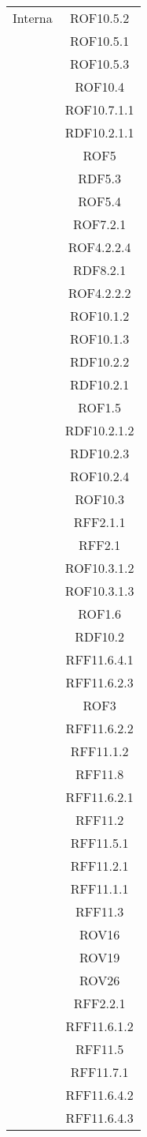 \begin{longtable}{|c|c|}
\midrule
Interna
& ROF10.5.2\\
& ROF10.5.1\\
& ROF10.5.3\\
& ROF10.4\\
& ROF10.7.1.1\\
& RDF10.2.1.1\\
& ROF5\\
& RDF5.3\\
& ROF5.4\\
& ROF7.2.1\\
& ROF4.2.2.4\\
& RDF8.2.1\\
& ROF4.2.2.2\\
& ROF10.1.2\\
& ROF10.1.3\\
& RDF10.2.2\\
& RDF10.2.1\\
& ROF1.5\\
& RDF10.2.1.2\\
& RDF10.2.3\\
& ROF10.2.4\\
& ROF10.3\\
& RFF2.1.1\\
& RFF2.1\\
& ROF10.3.1.2\\
& ROF10.3.1.3\\
& ROF1.6\\
& RDF10.2\\
& RFF11.6.4.1\\
& RFF11.6.2.3\\
& ROF3\\
& RFF11.6.2.2\\
& RFF11.1.2\\
& RFF11.8\\
& RFF11.6.2.1\\
& RFF11.2\\
& RFF11.5.1\\
& RFF11.2.1\\
& RFF11.1.1\\
& RFF11.3\\
& ROV16\\
& ROV19\\
& ROV26\\
& RFF2.2.1\\
& RFF11.6.1.2\\
& RFF11.5\\
& RFF11.7.1\\
& RFF11.6.4.2\\
& RFF11.6.4.3\\

\end{longtable}
